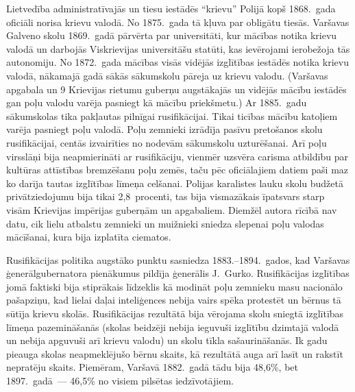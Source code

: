 \documentclass[twoside,a5paper,12pt,fleqn,openany]{extbook}
\begin{document}
Lietvedība administratīvajās un tiesu iestādēs ``krievu'' Polijā kopš 1868.~gada oficiāli norisa krievu valodā. No 1875.~gada tā kļuva par obligātu tiesās. Varšavas Galveno skolu 1869.~gadā pārvērta par universitāti, kur mācības notika krievu valodā un darbojās Viskrievijas universitāšu statūti, kas ievērojami ierobežoja tās autonomiju. No 1872.~gada mācības visās vidējās izglītības iestādēs notika krievu valodā, nākamajā gadā sākās sākumskolu pāreja uz krievu valodu. (Varšavas apgabala un 9 Krievijas rietumu guberņu augstākajās un vidējās mācību iestādēs gan poļu valodu varēja pasniegt kā mācību priekšmetu.) Ar 1885.~gadu sākumskolas tika pakļautas pilnīgai rusifikācijai. Tikai ticības mācību katoļiem varēja pasniegt poļu valodā. Poļu zemnieki izrādīja pasīvu pretošanos skolu rusifikācijai, centās izvairīties no nodevām sākumskolu uzturēšanai. Arī poļu virsslāņi bija neapmierināti ar rusifikāciju, vienmēr uzsvēra carisma atbildību par kultūras attīstības bremzēšanu poļu zemēs, taču pēc oficiālajiem datiem paši maz ko darīja tautas izglītības līmeņa celšanai. Polijas karalistes lauku skolu budžetā privātziedojumu bija tikai 2,8~procenti, tas bija vismazākais īpatsvars starp visām Krievijas impērijas guberņām un apgabaliem. Diemžēl autora rīcībā nav datu, cik lielu atbalstu zemnieki un muižnieki sniedza slepenai poļu valodas mācīšanai, kura bija izplatīta ciematos.

Rusifikācijas politika augstāko punktu sasniedza 1883.--1894.~gados, kad Varšavas ģenerālgubernatora pienākumus pildīja ģenerālis J.~Gurko. Rusifikācijas izglītības jomā faktiski bija stiprākais līdzeklis kā modināt poļu zemnieku masu nacionālo pašapziņu, kad lielai daļai inteliģences nebija vairs spēka protestēt un bērnus tā sūtīja krievu skolās. Rusifikācijas rezultātā bija vērojama skolu sniegtā izglītības līmeņa pazemināšanās (skolas beidzēji nebija ieguvuši izglītību dzimtajā valodā un nebija apguvuši arī krievu valodu) un skolu tīkla sašaurināšanās. Ik gadu pieauga skolas neapmeklējušo bērnu skaits, kā rezultātā auga arī lasīt un rakstīt nepratēju skaits. Piemēram, Varšavā 1882.~gadā tādu bija 48,6\%, bet 1897.~gadā~--- 46,5\% no visiem pilsētas iedzīvotājiem.
\end{document}

